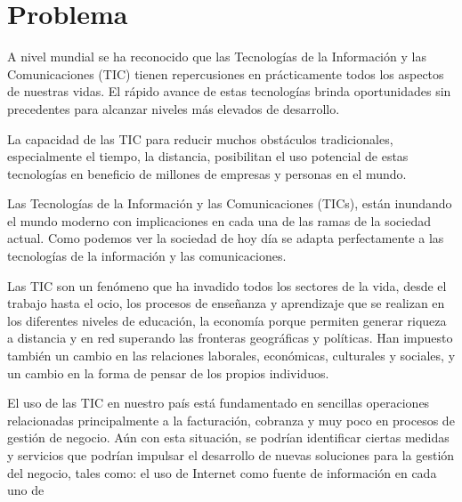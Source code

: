 \documentclass[12pt,a4paper]{article}
\newcommand{\espacio}{\par\vspace{3mm}}
\newcommand{\newsection}[1]{\section{\hspace{6mm} #1}}%
\begin{document}
\newpage
\newsection{Problema}
A nivel mundial se ha reconocido que las Tecnologías de la Información y las Comunicaciones (TIC) tienen repercusiones en prácticamente todos los aspectos de nuestras vidas. El rápido avance de estas tecnologías brinda oportunidades sin precedentes para alcanzar niveles más elevados de desarrollo.
\espacio La capacidad de las TIC para reducir muchos obstáculos tradicionales, especialmente el tiempo, la distancia, posibilitan el uso potencial de estas tecnologías en beneficio de millones de empresas y personas en el mundo.
\espacio Las Tecnologías de la Información y las Comunicaciones (TICs), están inundando el mundo moderno con implicaciones en cada una de las ramas de la sociedad actual. Como podemos ver la sociedad de hoy día se adapta perfectamente a las tecnologías de la información y las comunicaciones.
\espacio Las TIC son un fenómeno que ha invadido todos los sectores de la vida, desde el trabajo hasta el ocio, los procesos de enseñanza y aprendizaje que se realizan en los diferentes niveles de educación, la economía porque permiten generar riqueza a distancia y en red superando las fronteras geográficas y políticas. Han impuesto también un cambio en las relaciones laborales, económicas, culturales y sociales, y un cambio en la forma de pensar de los propios individuos.
\espacio El uso de las TIC en nuestro país está fundamentado en sencillas operaciones relacionadas principalmente a la facturación, cobranza y muy poco en procesos de gestión de negocio. Aún con esta situación, se podrían identificar ciertas medidas y servicios que podrían impulsar el desarrollo de nuevas soluciones para la gestión del negocio, tales como: el uso de Internet como fuente de información en cada uno de
\end{document}
